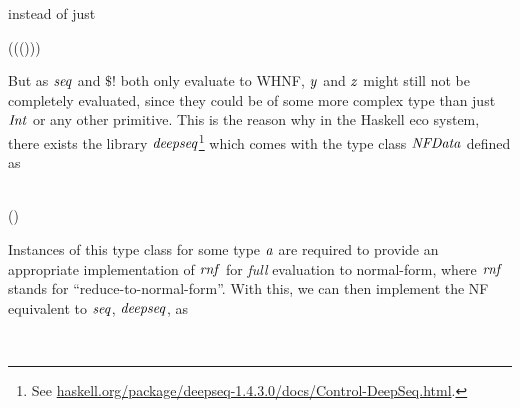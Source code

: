\documentclass[paper=A4,twoside=true,openright,parskip=full,chapterprefix=true,headings=normal,bibliography=totoc,listof=totoc,titlepage=on,captions=tableabove,draft=false,british]{scrreprt}%
\renewcommand{\enquote}[1]{{``}#1{''}}
\begin{document}
instead of just


\begin{hscode}\SaveRestoreHook
{}%
%
\>[B]{}\;\mathrel{=}\;(\;(\;(\;)))\;\;\<[E]%
\ColumnHook
\end{hscode}\resethooks
\vspace{-2\baselineskip}

But as \ensuremath{\Varid{seq}} and \ensuremath{\mathbin{\$!}} both only evaluate to WHNF, \ensuremath{\Varid{y}} and \ensuremath{\Varid{z}} might
still not be completely evaluated, since they could be of some more
complex type than just \ensuremath{\Conid{Int}} or any other primitive. This is the reason
why in the Haskell eco system, there exists the library
\ensuremath{\Varid{deepseq}}\footnote{See
  \url{haskell.org/package/deepseq-1.4.3.0/docs/Control-DeepSeq.html}.}
which comes with the type class \ensuremath{\Conid{NFData}} defined as


\begin{hscode}\SaveRestoreHook
{}%
%
%
\>[B]{}\;\;\;\<[E]%
\\
\>[B]{}\<[5]%
\>[5]{}\mathbin{::}\to (){}\<[E]%
\ColumnHook
\end{hscode}\resethooks
\vspace{-2\baselineskip}

Instances of this type class for some type \ensuremath{\Varid{a}} are required to provide
an appropriate implementation of \ensuremath{\Varid{rnf}} for \emph{full} evaluation to
normal-form, where \ensuremath{\Varid{rnf}} stands for \enquote{reduce-to-normal-form}.
With this, we can then implement the NF equivalent to \ensuremath{\Varid{seq}}, \ensuremath{\Varid{deepseq}},
as


\begin{hscode}\SaveRestoreHook
{}%
%
\>[B]{}\mathbin{::}\;\Rightarrow {}\to {}\to {}\<[E]%
\\
\>[B]{}\;\mathrel{=}\;\<[E]%
\ColumnHook
\end{hscode}\resethooks
\vspace{-2\baselineskip}
\end{document}
